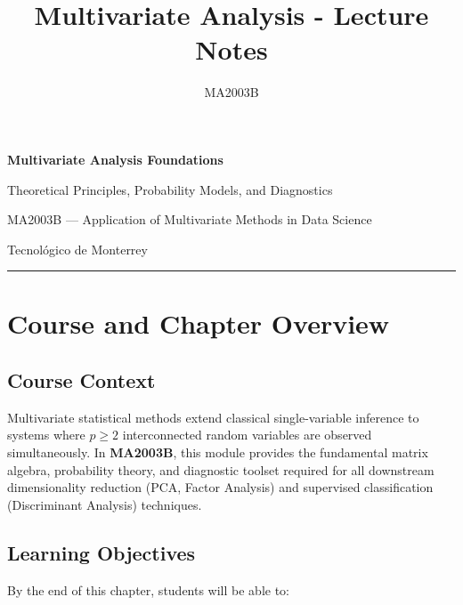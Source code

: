 \documentclass[
]{article}
\title{Multivariate Analysis - Lecture Notes}
\author{MA2003B}
\date{}
\begin{document}
\maketitle

\textbf{Multivariate Analysis Foundations}

Theoretical Principles, Probability Models, and Diagnostics

MA2003B --- Application of Multivariate Methods in Data Science

Tecnológico de Monterrey

\begin{center}\rule{0.5\linewidth}{0.5pt}\end{center}

\textbf{ }

\section{Course and Chapter Overview}

\textbf{ }

\subsection{Course Context}

Multivariate statistical methods extend classical single-variable
inference to systems where \(p \geq 2\) interconnected random variables
are observed simultaneously. In \textbf{MA2003B}, this module provides
the fundamental matrix algebra, probability theory, and diagnostic
toolset required for all downstream dimensionality reduction (PCA,
Factor Analysis) and supervised classification (Discriminant Analysis)
techniques.

\textbf{ }

\subsection{Learning Objectives}

By the end of this chapter, students will be able to:
\end{document}
